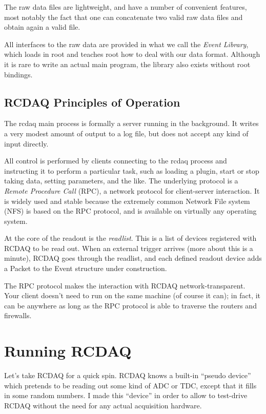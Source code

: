 \documentclass{article}[11pt]
\begin{document}
The raw data files are lightweight, and have a number of convenient
features, most notably the fact that one can concatenate two valid 
raw data files and obtain again a valid file.

All interfaces to the raw data are provided in what we call the
\emph{Event Library}, which loads in root and teaches root how to deal
with our data format. Although it is rare to write an actual main
program, the library also exists without root bindings. 

\subsection{RCDAQ Principles of Operation}

The rcdaq main process is formally a server running in the
background. It writes a very modest amount of output to a log file,
but does not accept any kind of input directly.

All control is performed by clients connecting to the rcdaq process
and instructing it to perform a particular task, such as loading a
plugin, start or stop taking data, setting parameters, and the
like. The underlying protocol is a \emph{Remote Procedure Call} (RPC),
a network protocol for client-server interaction. It is widely used
and stable because the extremely common Network File system (NFS) is
based on the RPC protocol, and is available on virtually any operating
system.

At the core of the readout is the \emph{readlist}. This is a list of
devices registered with RCDAQ to be read out. When an external trigger
arrives (more about this is a minute), RCDAQ goes through the
readlist, and each defined readout device adds a Packet to the Event
structure under construction.

The RPC protocol makes the interaction with RCDAQ
network-transparent. Your client doesn't need to run on the same
machine (of course it can); in fact, it can be anywhere as long as
the RPC protocol is able to traverse the routers and firewalls. 


\section{Running RCDAQ}

Let's take RCDAQ for a quick spin. RCDAQ knows a built-in ``pseudo
device'' which pretends to be reading out some kind of ADC or TDC,
except that it fills in some random numbers. I made this ``device'' in
order to allow to test-drive RCDAQ without the need for any actual
acquisition hardware.
\end{document}
